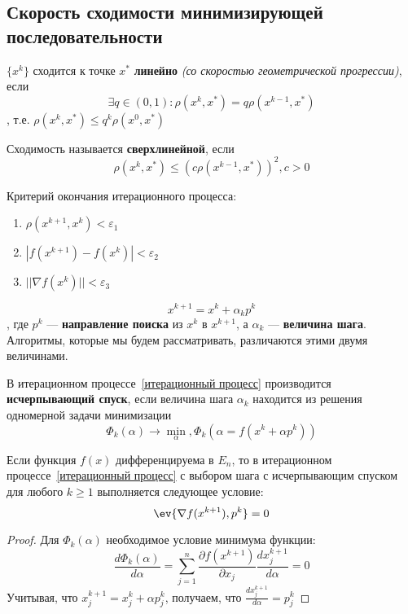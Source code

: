 \subsection{Скорость сходимости минимизирующей последовательности}

\begin{definition}
    \(\{x^k\} \) сходится к точке \(x^*\) \textbf{линейно} \textit{(со скоростью геометрической прогрессии)}, если
    \[\exists q \in (0, 1) : \rho(x^k, x^*) = q \rho(x^{k - 1}, x^*)\]
    , т.е. \(\rho(x^k, x^*) \leq q^k \rho(x^0, x^*)\)
\end{definition}

\begin{definition}
    Сходимость называется \textbf{сверхлинейной}, если
    \[\rho(x^k, x^*) \leq (c \rho(x^{k - 1}, x^*))^2, c > 0\]
\end{definition}

Критерий окончания итерационного процесса:
\begin{enumerate}
    \item \(\rho(x^{k + 1}, x^k) < \varepsilon_1\)
    \item \(|f(x^{k + 1}) - f(x^k)| < \varepsilon_2\)
    \item \(||\nabla f(x^k)|| < \varepsilon_3\)
\end{enumerate}

\begin{equation}
    x^{k + 1} = x^k + \alpha_k p^k
    \label{итерационный процесс}
\end{equation}
, где \(p^k\) --- \textbf{направление поиска} из \(x^k\) в \(x^{k + 1}\), а \(\alpha_k\) --- \textbf{величина шага}. Алгоритмы, которые мы будем рассматривать, различаются этими двумя величинами.

\begin{definition}
    В итерационном процессе~\eqref{итерационный процесс} производится \textbf{исчерпывающий спуск}, если величина шага \(\alpha_k\) находится из решения одномерной задачи минимизации
    \begin{equation}
        \Phi_k(\alpha) \to \min_\alpha, \Phi_k(\alpha = f(x^k + \alpha p^k))
        \label{исчерпывающий спуск}
    \end{equation}
\end{definition}

\begin{theorem}
    Если функция \(f(x)\) дифференцируема в \(E_n\), то в итерационном процессе~\eqref{итерационный процесс} с выбором шага с исчерпывающим спуском для любого \(k \geq 1\) выполняется следующее условие:
    \begin{equation}
        \ev{\nabla f(x^{k + 1}), p^k} = 0
        \label{условие при процессе}
    \end{equation}
\end{theorem}
\begin{proof} %
    Для \(\Phi_k(\alpha)\) необходимое условие минимума функции:
    \[\frac{d \Phi_k(\alpha)}{d \alpha} = \sum_{j = 1}^n \frac{\partial f(x^{k + 1})}{\partial x_j} \frac{d x_j^{k + 1}}{d \alpha} = 0\]
    Учитывая, что \(x^{k + 1}_j = x_j^k + \alpha p_j^k\), получаем, что \(\frac{d x_j^{k + 1}}{d \alpha} = p_j^k\)
\end{proof}

